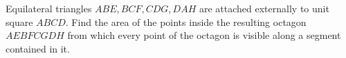 Equilateral triangles $ABE,BCF,CDG,DAH$ are attached externally to unit square $ABCD$. Find the area of the points inside the resulting octagon $AEBFCGDH$ from which every point of the octagon is visible along a segment contained in it.
